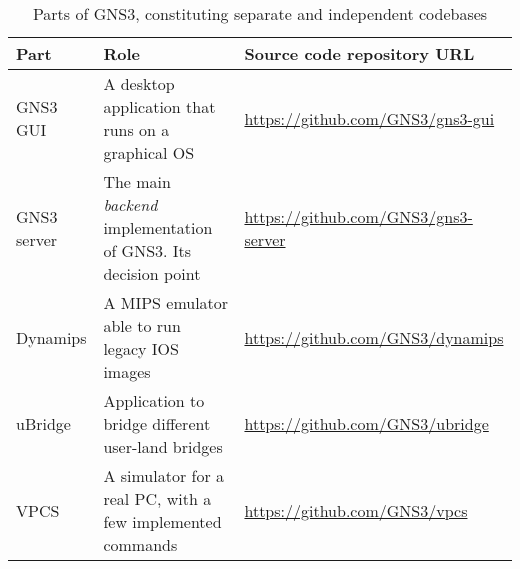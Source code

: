 \begin{table}
  \centering
  \small
  \begin{tabulary}{0.95\textwidth}{lLL}
    \toprule
      \textbf{Part}       & \textbf{Role}                                                           & \textbf{Source code repository URL}\\
    \midrule
      GNS3 GUI            & A desktop application that runs on a graphical OS                       & \scriptsize\url{https://github.com/GNS3/gns3-gui}\\
      GNS3 server         & The main \emph{backend} implementation of GNS3. Its decision point      & \scriptsize\url{https://github.com/GNS3/gns3-server}\\
      Dynamips            & A MIPS emulator able to run legacy IOS images                           & \scriptsize\url{https://github.com/GNS3/dynamips}\\
      uBridge             & Application to bridge different user-land bridges                       & \scriptsize\url{https://github.com/GNS3/ubridge}\\
      VPCS                & A simulator for a real PC, with a few implemented commands              & \scriptsize\url{https://github.com/GNS3/vpcs}\\
    \bottomrule
  \end{tabulary}
  \caption{%
    Parts of GNS3, constituting separate and independent codebases
  }
  \label{tab:gns3components}
\end{table}
